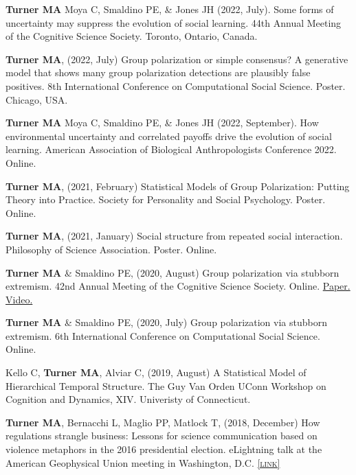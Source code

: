 \documentclass[11pt, letterpaper]{article}
\newcommand{\lurl}[1]{\href{#1}{\scriptsize\textsc{[link]}}}
\begin{document}
    \textbf{Turner MA} Moya C, Smaldino PE, \& Jones JH (2022, July). Some forms of
    uncertainty may suppress the evolution of social learning. 44th Annual Meeting of the
    Cognitive Science Society. Toronto, Ontario, Canada. 

    \textbf{Turner MA}, (2022, July) Group polarization or simple consensus?
    A generative model that shows many group polarization detections are
    plausibly false positives. 8th International Conference on Computational
    Social Science. Poster. Chicago, USA.

    \textbf{Turner MA} Moya C, Smaldino PE, \& Jones JH (2022, September). How
    environmental uncertainty and correlated payoffs drive the evolution of social
    learning. American Association of Biological Anthropologists Conference 2022.
    Online.

    \textbf{Turner MA}, (2021, February) Statistical Models of Group Polarization: Putting Theory into Practice. Society for Personality and Social Psychology. Poster. Online.

    \textbf{Turner MA}, (2021, January) Social structure from repeated social interaction. Philosophy of Science Association. Poster. Online.

    \textbf{Turner MA} \& Smaldino PE, (2020, August) Group polarization via stubborn extremism. 42nd Annual Meeting of the Cognitive Science Society. Online. \href{https://www.researchgate.net/publication/342153646_Stubborn_extremism_as_a_potential_pathway_to_group_polarization}{Paper.} \href{https://youtu.be/i5PHjwu1p40}{Video.}

   \textbf{Turner MA} \& Smaldino PE, (2020, July) Group polarization via stubborn extremism. 6th International Conference on Computational Social Science. Online.

  Kello C, \textbf{Turner MA}, Alviar C, (2019, August) A Statistical Model of
  Hierarchical Temporal Structure. The Guy Van Orden UConn Workshop on Cognition
  and Dynamics, XIV. Univeristy of Connecticut.

  \textbf{Turner MA}, Bernacchi L, Maglio PP, Matlock T, (2018, December) How regulations
  strangle business: Lessons for science communication based on violence metaphors in the 2016
  presidential election. eLightning talk at the American Geophysical Union meeting in Washington,
  D.C. \lurl{https://agu.confex.com/agu/fm18/meetingapp.cgi/Paper/451955}
\end{document}
